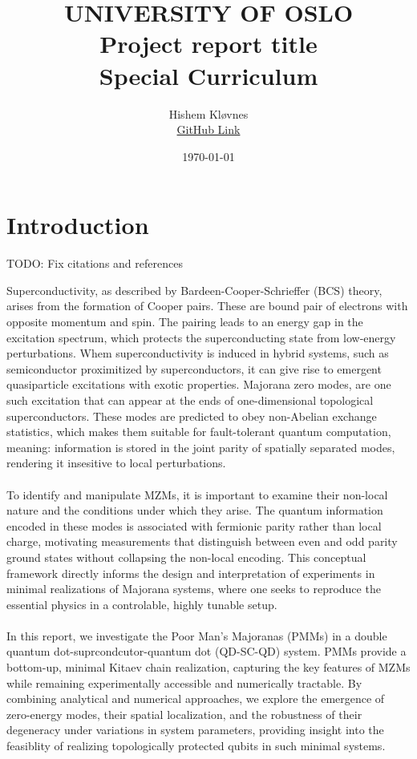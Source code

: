 \documentclass[11pt, letterpaper, titlepage]{article}
\title{
 \textbf{\LARGE UNIVERSITY OF OSLO} \\
\vspace{37mm}
\textbf{\Large Project report title}\\
\vspace{7mm}
\Large Special Curriculum \\
\vspace{25mm}
}
\author{\Large Hishem Kløvnes \\ \textcolor{blue}{\href{https://github.com/hishemok/Special_curriculum}{GitHub Link} }}
\date{\Large \today} %
\begin{document}
\sloppy
\maketitle
\newpage


\tableofcontents
\section{Introduction}
\Large TODO: Fix citations and references

Superconductivity, as described by Bardeen-Cooper-Schrieffer (BCS) theory, arises from the formation of Cooper pairs. These are bound pair of electrons with opposite momentum and spin. The pairing leads to an energy gap in the excitation spectrum, which protects the superconducting state from low-energy perturbations. Whem superconductivity is induced in hybrid systems, such as semiconductor proximitized by superconductors, it can give rise to emergent quasiparticle excitations with exotic properties. Majorana zero modes, are one such excitation that can appear at the ends of one-dimensional topological superconductors. These modes are predicted to obey non-Abelian exchange statistics, which makes them suitable for fault-tolerant quantum computation, meaning: information is stored in the joint parity of spatially separated modes, rendering it insesitive to local perturbations.\\ \\
To identify and manipulate MZMs, it is important to examine their non-local nature and the conditions under which they arise. The quantum information encoded in these modes is associated with fermionic parity rather than local charge, motivating measurements that distinguish between even and odd parity ground states without collapsing the non-local encoding. This conceptual framework directly informs the design and interpretation of experiments in minimal realizations of Majorana systems, where one seeks to reproduce the essential physics in a controlable, highly tunable setup. \\ \\
In this report, we investigate the Poor Man's Majoranas (PMMs) in a double quantum dot-suprcondcutor-quantum dot (QD-SC-QD) system. PMMs provide a bottom-up, minimal Kitaev chain realization, capturing the key features of MZMs while remaining experimentally accessible and numerically tractable. By combining analytical and numerical approaches, we explore the emergence of zero-energy modes, their spatial localization, and the robustness of their degeneracy under variations in system parameters, providing insight into the feasiblity of realizing topologically protected qubits in such minimal systems.\\
\end{document}
